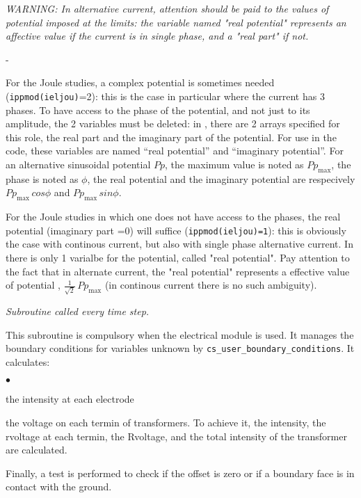 {{{ {\em WARNING: In alternative current, attention should be paid to the values of potential
 imposed at the limits: the variable named "real potential" represents an affective
 value if the current is in single phase, and a "real part" if not.}
\begin{list}{-}{}
\item For the Joule studies, a complex potential is sometimes needed
 (\texttt{ippmod(ieljou)}=2): this is the  case in particular where the current
 has 3 phases. To have access to the phase of the potential, and not just to its
 amplitude, the 2 variables must be deleted: in \CS, there are 2 arrays
 specified for this role, the real part and the imaginary
 part of the potential. For use in the code, these variables are named
 ``real potential'' and ``imaginary potential''. For an alternative
 sinusoidal potential $Pp$, the maximum value is noted as $Pp_\text{max}$,
 the phase is noted as $\phi$, the real potential
 and the imaginary potential are respecively $Pp_\text{max}\,cos\phi$ and
$Pp_\text{max}\,sin\phi$.
\item For the Joule studies in which one does not have access to the phases, the real
 potential (imaginary part =0) will suffice (\texttt{ippmod(ieljou)=1}): this is
 obviously the case with
 continous current, but also with single phase alternative current. In \CS
there is only 1 varialbe for the potential,  called "real potential". Pay attention to
 the fact that in alternate current, the "real potential" represents a effective value
 of potential , $\frac{1}{\sqrt{2}}\,Pp_\text{max}$ (in continous current there is no
 such ambiguity).
\end{list}

\noindent
\textit{Subroutine called every time step.}

This subroutine is compulsory when the electrical module is used. It
 manages the boundary conditions for variables unknown by \texttt{cs\_user\_boundary\_conditions}.
 It calculates:
\begin{list}{$\bullet$}{}
\item  the intensity at each electrode
\item  the voltage on each termin of transformers. To achieve it, the intensity,
 the rvoltage at each termin, the Rvoltage, and the total intensity of the 
transformer are calculated. 
\end{list}

Finally, a test is performed to check if the offset is zero or if a boundary
 face is in contact with the ground.

}}}
